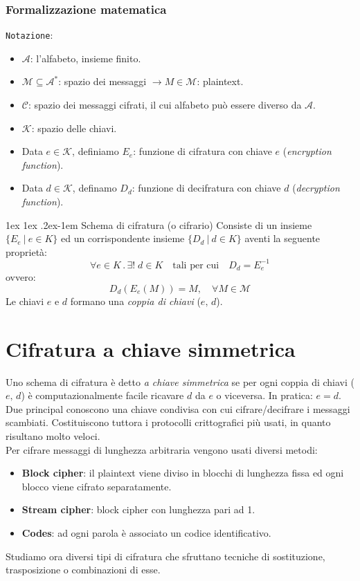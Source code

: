 \documentclass[a4paper, 11pt, twoside, openright, fleqn]{report}
\makeatletter
\renewcommand{\paragraph}{%
	\@startsection{paragraph}{4}%
	{\z@}{1ex \@plus 1ex \@minus .2ex}{-1em}%
	{\normalfont\normalsize\bfseries}%
}
\makeatother
\begin{document}
\subsubsection{Formalizzazione matematica}
\texttt{Notazione}:
\begin{itemize}
	\item $\mathcal{A}$: l'alfabeto, insieme finito.
	\item $\mathcal{M}\subseteq \mathcal{A}^*$: spazio dei messaggi $\longrightarrow M\in \mathcal{M}$: plaintext.
	\item $\mathcal{C}$: spazio dei messaggi cifrati, il cui alfabeto può essere diverso da $\mathcal{A}$.
	\item $\mathcal{K}$: spazio delle chiavi.
	\item Data $e\in \mathcal{K}$, definiamo $E_e$: funzione di cifratura con chiave $e$ (\emph{encryption function}).
	\item Data $d\in \mathcal{K}$, definamo $D_d$: funzione di decifratura con chiave $d$ (\emph{decryption function}).
\end{itemize}

\paragraph{Schema di cifratura (o cifrario)}
Consiste di un insieme $\{E_e\ |\ e\in K\}$ ed un corrispondente insieme $\{D_d\ |\ d\in K\}$ aventi la seguente proprietà:
\begin{equation*}
	\forall e \in K\,.\,\exists!\;d\in K \quad\mbox{tali per cui}\quad D_d = E_e^{-1}
\end{equation*}
ovvero:
\begin{equation*}
	D_d(E_e(M)) = M, \quad \forall M\in \mathcal{M}
\end{equation*}
Le chiavi $e$ e $d$ formano una \emph{coppia di chiavi} ($e,\,d$).

\section{Cifratura a chiave simmetrica}
Uno schema di cifratura è detto \emph{a chiave simmetrica} se per ogni coppia di chiavi ($e,\,d$) è computazionalmente facile ricavare $d$ da $e$ o viceversa. In pratica: $e=d$. Due principal conoscono una chiave condivisa con cui cifrare/decifrare i messaggi scambiati. Costituiscono tuttora i protocolli crittografici più usati, in quanto risultano molto veloci.\\
Per cifrare messaggi di lunghezza arbitraria vengono usati diversi metodi:
\begin{itemize}
	\item \textbf{Block cipher}: il plaintext viene diviso in blocchi di lunghezza fissa ed ogni blocco viene cifrato separatamente.
	\item \textbf{Stream cipher}: block cipher con lunghezza pari ad 1.
	\item \textbf{Codes}: ad ogni parola è associato un codice identificativo.
\end{itemize}
Studiamo ora diversi tipi di cifratura che sfruttano tecniche di sostituzione, trasposizione o combinazioni di esse.
\end{document}
